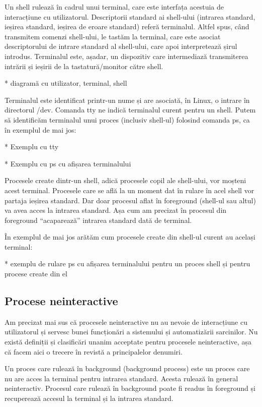 Un shell rulează în cadrul unui terminal, care este interfața acestuia de
interacțiune cu utilizatorul. Descriptorii standard ai shell-ului (intrarea
standard, ieșirea standard, ieșirea de eroare standard) referă terminalul.
Altfel spus, când transmitem comenzi shell-ului, le tastăm la terminal, care
este asociat descriptorului de intrare standard al shell-ului, care apoi
interpretează șirul introdus. Terminalul este, așadar, un dispozitiv care
intermediază transmiterea intrării și ieșirii de la tastatură/monitor către
shell.

* diagramă cu utilizator, terminal, shell

Terminalul este identificat printr-un nume și are asociată, în Linux, o intrare
în directorul /dev. Comanda tty ne indică terminalul curent pentru un shell.
Putem să identificăm terminalul unui proces (inclusiv shell-ul) folosind comanda
ps, ca în exemplul de mai jos:

* Exemplu cu tty

* Exemplu cu ps cu afișarea terminalului

Procesele create dintr-un shell, adică procesele copil ale shell-ului, vor
moșteni acest terminal. Procesele care se află la un moment dat în rulare în
acel shell vor partaja ieșirea standard. Dar doar procesul aflat în foreground
(shell-ul sau altul) va avea acces la intrarea standard. Așa cum am precizat în
 procesul
din foreground “acaparează” intrarea standard dată de terminal.

În exemplul de mai jos arătăm cum procesele create din shell-ul curent au
același terminal:

* exemplu de rulare ps cu afișarea terminalului pentru un proces shell și pentru
procese create din el

\subsection{Procese neinteractive}
\label{sec:procese-interactivitate-neinteractive}

Am precizat mai sus că procesele neinteractive nu au nevoie de interacțiune cu
utilizatorul și servesc bunei funcționări a sistemului și automatizării
sarcinilor. Nu există definiții și clasificări unanim acceptate pentru procesele
neinteractive, așa că facem aici o trecere în revistă a principalelor denumiri.

Un proces care rulează în background (background process) este un proces care nu
are acces la terminal pentru intrarea standard. Acesta rulează în general
neinteractiv. Procesul care rulează în background poate fi readus în foreground
și recuperează accesul la terminal și la intrarea standard.

